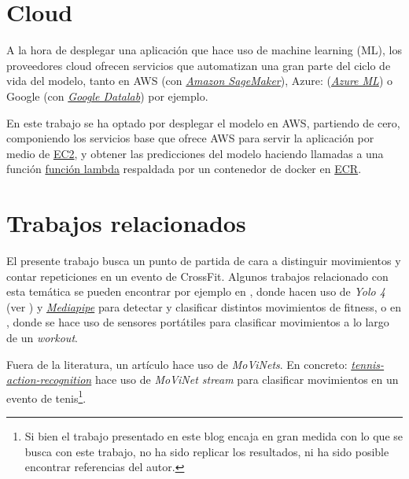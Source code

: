 \section{Cloud}

A la hora de desplegar una aplicación que hace uso de machine learning (ML), los proveedores cloud ofrecen servicios que automatizan una gran parte del ciclo de vida del modelo, tanto en AWS (con \href{https://aws.amazon.com/sagemaker/?nc1=h_ls}{\textit{Amazon SageMaker}}), Azure: (\href{https://azure.microsoft.com/es-es/services/machine-learning/#product-overview}{\textit{Azure ML}}) o Google (con \href{https://cloud.google.com/datalab/docs}{\textit{Google Datalab}}) por ejemplo.

En este trabajo se ha optado por desplegar el modelo en AWS, partiendo de cero, componiendo los servicios base que ofrece AWS para servir la aplicación por medio de \href{https://aws.amazon.com/ec2/?nc1=h_ls}{EC2}, y obtener las predicciones del modelo haciendo llamadas a una función \href{https://aws.amazon.com/lambda/?nc1=h_ls}{función lambda} respaldada por un contenedor de docker en \href{https://aws.amazon.com/ecr/?nc1=h_ls}{ECR}.

\section{Trabajos relacionados}

El presente trabajo busca un punto de partida de cara a distinguir movimientos y contar repeticiones en un evento de CrossFit. Algunos trabajos relacionado con esta temática se pueden encontrar por ejemplo en 
\cite{FitnessMovementTypes}, donde hacen uso de \textit{Yolo 4} (ver 
\cite{Yolo4}) y \href{https://mediapipe.dev/}{\textit{Mediapipe}} para detectar y clasificar distintos movimientos de fitness, o en \cite{ClassifyFunctionalFitness}, donde se hace uso de sensores portátiles para clasificar movimientos a lo largo de un \textit{workout}. 

Fuera de la literatura, un artículo hace uso de \textit{MoViNets}.
En concreto: \href{https://blog.ml6.eu/sports-video-analysis-in-the-real-world-realtime-tennis-action-recognition-using-movinet-stream-813200aa589f}{\textit{tennis-action-recognition}} hace uso de \textit{MoViNet stream} para clasificar movimientos en un evento de tenis\footnote{Si bien el trabajo presentado en este blog encaja en gran medida con lo que se busca con este trabajo, no ha sido replicar los resultados, ni ha sido posible encontrar referencias del autor.}.

